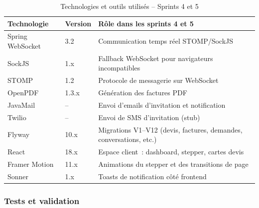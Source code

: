 \begin{table}[H]
  \caption{Technologies et outils utilisés -- Sprints 4 et 5}
  \label{tab:tech-r3}
  \centering
  \begin{tabularx}{\textwidth}{|L{3cm}|L{3cm}|X|}
    \hline
    \textbf{Technologie} & \textbf{Version} & \textbf{Rôle dans les sprints 4 et 5} \\
    \hline
    Spring WebSocket & 3.2 & Communication temps réel STOMP/SockJS \\
    \hline
    SockJS & 1.x & Fallback WebSocket pour navigateurs incompatibles \\
    \hline
    STOMP & 1.2 & Protocole de messagerie sur WebSocket \\
    \hline
    OpenPDF & 1.3.x & Génération des factures PDF \\
    \hline
    JavaMail & -- & Envoi d'emails d'invitation et notification \\
    \hline
    Twilio & -- & Envoi de SMS d'invitation (stub) \\
    \hline
    Flyway & 10.x & Migrations V1--V12 (devis, factures, demandes, conversations, etc.) \\
    \hline
    React & 18.x & Espace client~: dashboard, stepper, cartes devis \\
    \hline
    Framer Motion & 11.x & Animations du stepper et des transitions de page \\
    \hline
    Sonner & 1.x & Toasts de notification côté frontend \\
    \hline
  \end{tabularx}
\end{table}

\subsubsection{Tests et validation}

